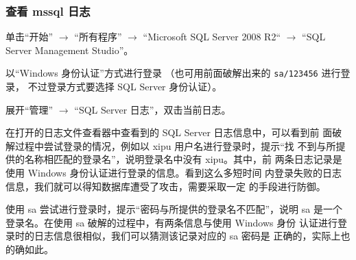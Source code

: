 \subsubsection{查看 mssql 日志}
单击``开始'' $ \rightarrow $ ``所有程序''
$ \rightarrow $ ``Microsoft SQL Server 2008 R2`` $ \rightarrow $
``SQL Server Management Studio''。

以``Windows 身份认证''方式进行登录
（也可用前面破解出来的 \texttt{sa/123456} 进行登录，
不过登录方式要选择 SQL Server 身份认证）。

展开``管理'' $ \rightarrow $ ``SQL Server 日志''，双击当前日志。

在打开的日志文件查看器中查看到的 SQL Server 日志信息中，可以看到前
面破解过程中尝试登录的情况，例如以 xipu 用户名进行登录时，提示``找
不到与所提供的名称相匹配的登录名''，说明登录名中没有 xipu。其中，前
两条日志记录是使用 Windows 身份认证进行登录的信息。看到这么多短时间
内登录失败的日志信息，我们就可以得知数据库遭受了攻击，需要采取一定
的手段进行防御。

使用 sa 尝试进行登录时，提示``密码与所提供的登录名不匹配''，说明 sa
是一个登录名。在使用 sa 破解的过程中，有两条信息与使用 Windows 身份
认证进行登录时的日志信息很相似，我们可以猜测该记录对应的 sa 密码是
正确的，实际上也的确如此。
